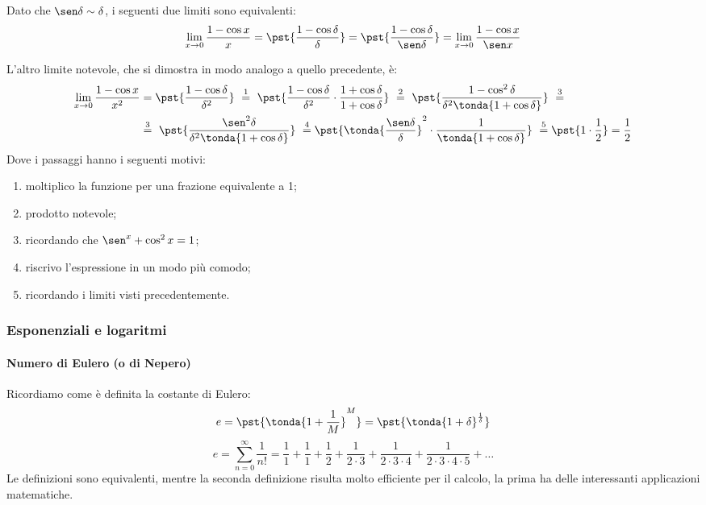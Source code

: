 \begin{osservazione}
Dato che \(\sen \delta \sim \delta\), i seguenti due limiti sono 
equivalenti:
\[\lim_{x \rightarrow 0} \frac{1-\cos x}{x} =
 \pst{\frac{1-\cos \delta}{\delta}} =
 \pst{\frac{1-\cos \delta}{\sen \delta}} =
 \lim_{x \rightarrow 0} \frac{1-\cos x}{\sen x}\]
\end{osservazione}

L'altro limite notevole, che si dimostra in modo analogo a quello 
precedente, è:
\begin{align*}
 \lim_{x \rightarrow 0} \frac{1-\cos x}{x^2} &=
 \pst{\frac{1-\cos \delta}{\delta^2}}
~ \stackrel{1}{=} ~  
 \pst{\frac{1-\cos \delta}{\delta^2} \cdot 
      \frac{1+\cos \delta}{1+\cos \delta}}
~ \stackrel{2}{=} ~ 
 \pst{\frac{1-\cos^2 \delta}{\delta^2 \tonda{1+\cos \delta}}}~ 
\stackrel{3}{=} \\
& \stackrel{3}{=} ~
 \pst{\frac{\sen^2 \delta}{\delta^2 \tonda{1+\cos \delta}}}
~ \stackrel{4}{=}
 \pst{\tonda{\frac{\sen \delta}{\delta}}^2 \cdot 
      \frac{1}{\tonda{1+\cos \delta}}}
~ \stackrel{5}{=}
 \pst{1 \cdot \frac{1}{2}} = \frac{1}{2}
\end{align*}
Dove i passaggi hanno i seguenti motivi:
\begin{enumerate} [nosep]
 \item moltiplico la funzione per una frazione equivalente a 1;
 \item prodotto notevole;
 \item ricordando che \(\sen^x + \cos^2 x = 1\);
 \item riscrivo l'espressione in un modo più comodo;
 \item ricordando i limiti visti precedentemente.
\end{enumerate}

\subsubsection{Esponenziali e logaritmi}

\paragraph{Numero di Eulero (o di Nepero)}

Ricordiamo come è definita la costante di Eulero:
\[e = \pst{\tonda{1+\frac{1}{M}}^M} = 
\pst{\tonda{1+\delta}^\frac{1}{\delta}} 
\]
\[e=\sum_{n=0}^{\infty}{\frac{1}{n!}}=
\frac{1}{1}+\frac{1}{1}+\frac{1}{2}+\frac{1}{2\cdot3}+
\frac{1}{2\cdot3\cdot4}+\frac{1}{2\cdot3\cdot4\cdot5}+\dots\]
Le definizioni sono equivalenti, mentre la seconda definizione risulta 
molto efficiente per il calcolo, la 
prima ha delle interessanti applicazioni matematiche.


